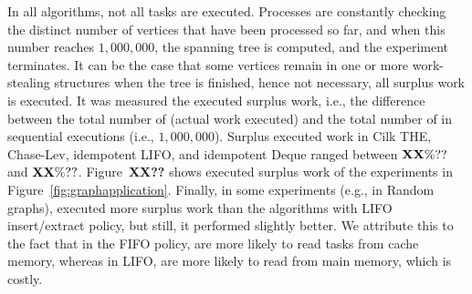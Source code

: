 In all algorithms, not all tasks are executed. Processes are constantly checking the distinct number of vertices that have been processed so far, and when this number reaches $1,000,000$, the spanning tree is computed, and the experiment terminates.  It can be the case that some vertices remain in one or more work-stealing structures when the tree is finished, hence not necessary, all surplus work is executed. It was measured the executed surplus work, i.e., the difference between the total number of \Takes (actual work executed) and the total number of \Takes in sequential executions (i.e., $1,000,000$).  Surplus executed work in Cilk THE, Chase-Lev, idempotent LIFO, and idempotent Deque ranged between $\bf XX\%??$ and $\bf XX\%??$.  Figure~{\bf XX??} shows executed surplus work of the experiments in Figure~\ref{fig:graphapplication}.  Finally, in some experiments (e.g., in Random graphs), \NCWSM executed more surplus work than the algorithms with LIFO insert/extract policy, but still, it performed slightly better. We attribute this to the fact that in the FIFO policy, \Takes are more likely to read tasks from cache memory, whereas in LIFO, \Takes are more likely to read from main memory, which is costly.


